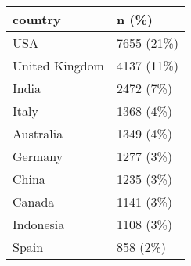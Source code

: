 \begin{table}[ht]
\centering
\begin{tabular}{ll}
 country & n (\%) \\ 
  \hline
USA & 7655 (21\%) \\ 
  United Kingdom & 4137 (11\%) \\ 
  India & 2472 (7\%) \\ 
  Italy & 1368 (4\%) \\ 
  Australia & 1349 (4\%) \\ 
  Germany & 1277 (3\%) \\ 
  China & 1235 (3\%) \\ 
  Canada & 1141 (3\%) \\ 
  Indonesia & 1108 (3\%) \\ 
  Spain & 858 (2\%) \\ 
  \end{tabular}
\end{table}
